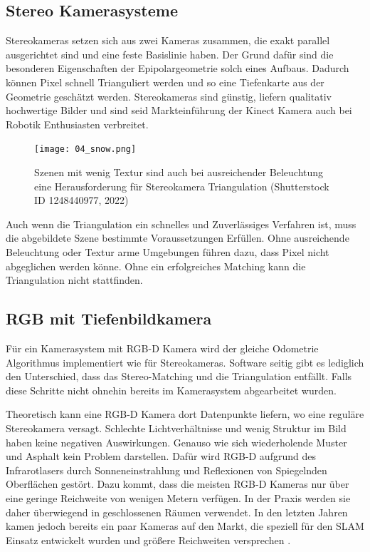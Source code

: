 \subsection{Stereo Kamerasysteme}
Stereokameras setzen sich aus zwei Kameras zusammen, die exakt parallel ausgerichtet sind und eine feste Basislinie haben. Der Grund dafür sind die besonderen Eigenschaften der Epipolargeometrie solch eines Aufbaus. Dadurch können Pixel schnell Trianguliert werden und so eine Tiefenkarte aus der Geometrie geschätzt werden. Stereokameras sind günstig, liefern qualitativ hochwertige Bilder und sind seid Markteinführung der Kinect Kamera auch bei Robotik Enthusiasten verbreitet. 
\begin{figure}[!ht]
  \centering
  \texttt{[image: 04\_snow.png]}
  \caption[Verschneite Stra{\ss}e]{Szenen mit wenig Textur sind auch bei ausreichender Beleuchtung eine Herausforderung für Stereokamera Triangulation (Shutterstock ID 1248440977, 2022)}
\end{figure}
Auch wenn die Triangulation ein schnelles und Zuverlässiges Verfahren ist, muss die abgebildete Szene bestimmte Voraussetzungen Erfüllen. Ohne ausreichende Beleuchtung oder Textur arme Umgebungen führen dazu, dass Pixel nicht abgeglichen werden könne. Ohne ein erfolgreiches Matching kann die Triangulation nicht stattfinden.  


\subsection{RGB mit Tiefenbildkamera}
Für ein Kamerasystem mit RGB-D Kamera wird der gleiche Odometrie Algorithmus implementiert wie für Stereokameras. Software seitig gibt es lediglich den Unterschied, dass das Stereo-Matching und die Triangulation entfällt. Falls diese Schritte nicht ohnehin bereits im Kamerasystem abgearbeitet wurden.

Theoretisch kann eine RGB-D Kamera dort Datenpunkte liefern, wo eine reguläre Stereokamera versagt. Schlechte Lichtverhältnisse und wenig Struktur im Bild haben keine negativen Auswirkungen. Genauso wie sich wiederholende Muster und Asphalt kein Problem darstellen. Dafür wird RGB-D aufgrund des Infrarotlasers durch Sonneneinstrahlung und Reflexionen von Spiegelnden Oberflächen gestört. Dazu kommt, dass die meisten RGB-D Kameras nur über eine geringe Reichweite von wenigen Metern verfügen. In der Praxis werden sie daher überwiegend in geschlossenen Räumen verwendet. In den letzten Jahren kamen jedoch bereits ein paar Kameras auf den Markt, die speziell für den SLAM Einsatz entwickelt wurden und grö{\ss}ere Reichweiten versprechen \cite{rgbd}.


